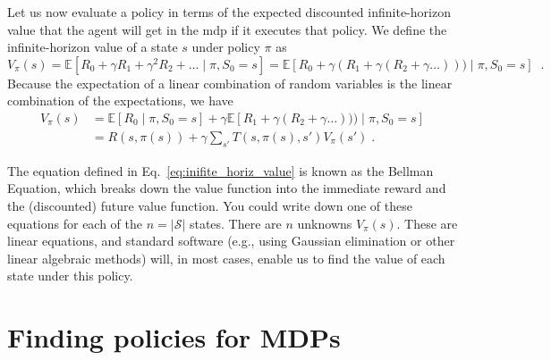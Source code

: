 
Let us now evaluate a policy in terms of the expected discounted
infinite-horizon value that the agent will get in the {\sc mdp} if it
executes that policy.  We define the infinite-horizon value of a state
$s$ under policy $\pi$ as
\begin{equation}
  V_{\pi}(s) = \mathbb{E}[R_0 + \gamma R_1 + \gamma^2 R_2 +
    \dots \mid \pi, S_0 = s] = \mathbb{E}[R_0 + \gamma(R_1 + \gamma(R_2 + \gamma
    \dots))) \mid \pi, S_0 = s] \;\;.
\end{equation}
Because the expectation of a linear combination of random variables is
the linear combination of the expectations, we have
\begin{align}
  V_{\pi}(s) & = \mathbb{E}[R_0 \mid \pi, S_0 = s] + \gamma  \mathbb{E}[
    R_1 + \gamma(R_2 + \gamma \dots))) \mid \pi, S_0 = s]
  \nonumber
  \\
             & = R(s, \pi(s)) + \gamma\sum_{s'}T(s, \pi(s), s')V_{\pi}(s') \; .
  \label{eq:inifite_horiz_value}
\end{align}

The equation defined in Eq.~\ref{eq:inifite_horiz_value} is known as the Bellman Equation,
which breaks down the value function into the immediate reward and the (discounted) future
value function.
You could write down one of these equations for each of the $n =
  |\mathcal S|$ states. There are $n$ unknowns $V_{\pi}(s)$.  These are
linear equations, and standard software (e.g., using Gaussian
elimination or other linear algebraic methods) will, in most cases,
enable us to find the value of each state under this policy.

\section{Finding policies for MDPs}

\label{sec-finding_mdp_policies}

